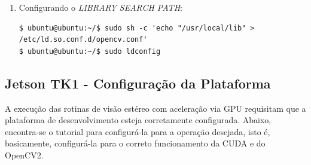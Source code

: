\begin{enumerate}
\begin{enumerate}
   \item Configurando o \textit{LIBRARY SEARCH PATH}:
   \begin{lstlisting}[basicstyle=\tiny]
$ ubuntu@ubuntu:~/$ sudo sh -c 'echo "/usr/local/lib" > /etc/ld.so.conf.d/opencv.conf'
$ ubuntu@ubuntu:~/$ sudo ldconfig

  \end{lstlisting}

  \end{enumerate}

\end{enumerate}

\subsection{Jetson TK1 - Configuração da Plataforma}
\label{jetsonSetupCUDA}

A execução das rotinas de visão estéreo com aceleração via GPU requisitam que a plataforma de desenvolvimento esteja corretamente configurada. Abaixo, encontra-se o tutorial para configurá-la para a operação desejada, isto é, basicamente, configurá-la para o correto funcionamento da CUDA e do OpenCV2. 

